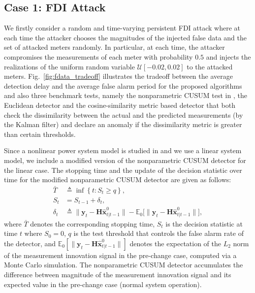 \documentclass[onecolumn]{IEEEtran}
\def\inf{\mathop{\mathrm{inf}}}
\begin{document}
\subsection{Case 1: FDI Attack} \label{sec:num_fdi}

We firstly consider a random and time-varying persistent FDI attack where at each time the attacker chooses the magnitudes of the injected false data and the set of attacked meters randomly. In particular, at each time, the attacker compromises the measurements of each meter with probability $0.5$ and injects the realizations of the uniform random variable $\mathcal{U}[-0.02,0.02]$ to the attacked meters. Fig.~\ref{fig:fdata_tradeoff} illustrates the tradeoff between the average detection delay and the average false alarm period for the proposed algorithms and also {three benchmark tests, namely the nonparametric CUSUM test in \cite{yang2016false},} the Euclidean detector \cite{Manandhar14} and the cosine-similarity metric based detector \cite{Rawat15} that both check the dissimilarity between the actual and the predicted measurements (by the Kalman filter) and declare an anomaly if the dissimilarity metric is greater than certain thresholds.

{Since a nonlinear power system model is studied in \cite{yang2016false} and we use a linear system model, we include a modified version of the nonparametric CUSUM detector for the linear case. The stopping time and the update of the decision statistic over time for the modified nonparametric CUSUM detector are given as follows:
\begin{align} \nonumber
\bar{T} &\triangleq \inf\left\{t: S_t \geq q \right\}, \\ \nonumber
S_t &= S_{t-1} + \delta_t, \\ \nonumber
\delta_t &\triangleq \|\mathbf{y}_t - \mathbf{H} \hat{\mathbf{x}}_{t|t-1}^0\| - \mathbb{E}_0\big[\|\mathbf{y}_t - \mathbf{H} \hat{\mathbf{x}}_{t|t-1}^0\|\big],
\end{align}
where $\bar{T}$ denotes the corresponding stopping time, $S_t$ is the decision statistic at time $t$ where $S_0 = 0$, $q$ is the test threshold that controls the false alarm rate of the detector, and $\mathbb{E}_0[\|\mathbf{y}_t - \mathbf{H} \hat{\mathbf{x}}_{t|t-1}^0\|]$ denotes the expectation of the $L_2$ norm of the measurement innovation signal in the pre-change case, computed via a Monte Carlo simulation. The nonparametric CUSUM detector accumulates the difference between magnitude of the measurement innovation signal and its expected value in the pre-change case (normal system operation).}
\end{document}
